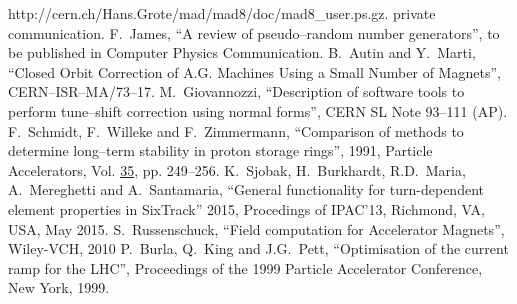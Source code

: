 \documentclass[a4paper,11pt]{report}
\begin{document}
\begin{thebibliography}{99}
  {http://cern.ch/Hans.Grote/mad/mad8/doc/mad8\_user.ps.gz}.
%
 private communication.  
%
 F.~James, ``A review of
  pseudo--random number generators'', to be published in Computer
  Physics Communication.  
%
 B.~Autin and Y.~Marti, ``Closed Orbit Correction of
  A.G. Machines Using a Small Number of Magnets'',
  CERN--ISR--MA/73--17.
%
 M.~Giovannozzi,
  ``Description of software tools to perform tune--shift correction
  using normal forms'', CERN SL Note 93--111 (AP).
%
 F.~Schmidt, F.~Willeke and F.~Zimmermann,
  ``Comparison of methods to determine long--term stability in proton
  storage rings'', 1991, Particle Accelerators, Vol. \underline{35},
  pp. 249--256.  
%
%
 K.~Sjobak, H.~Burkhardt, R.D.~Maria, A.~Mereghetti and A.~Santamaria,
  ``General functionality for turn-dependent element properties in SixTrack''
  2015, Procedings of IPAC'13, Richmond, VA, USA, May 2015.
%
 S.~Russenschuck,
  ``Field computation for Accelerator Magnets'',
  Wiley-VCH, 2010
 P.~Burla, Q.~King and J.G.~Pett,
  ``Optimisation of the current ramp for the LHC'',
  Proceedings of the 1999 Particle Accelerator Conference, New York, 1999.
  
%

\end{thebibliography}
\end{document}
